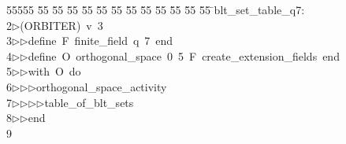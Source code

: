 %
%
\begin{tabbing}
55555 \= 55 \= 55 \= 55 \= 55 \= 55 \= 55 \= 55 \= 55 \= 55 \= 55 \= 55 \= 55 \= \>blt\_set\_table\_q7:\ \\[0pt]
2\>$\triangleright$\>(ORBITER)\ v\ 3\ \\[0pt]
3\>$\triangleright$\>$\triangleright$\>define\ F\ finite\_field\ q\ 7\ end\ \\[0pt]
4\>$\triangleright$\>$\triangleright$\>define\ O\ orthogonal\_space\ 0\ 5\ F\ create\_extension\_fields\ end\ \\[0pt]
5\>$\triangleright$\>$\triangleright$\>with\ O\ do\ \\[0pt]
6\>$\triangleright$\>$\triangleright$\>$\triangleright$\>orthogonal\_space\_activity\ \\[0pt]
7\>$\triangleright$\>$\triangleright$\>$\triangleright$\>$\triangleright$\>table\_of\_blt\_sets\ \\[0pt]
8\>$\triangleright$\>$\triangleright$\>end\\[0pt]
9\>\end{tabbing}
